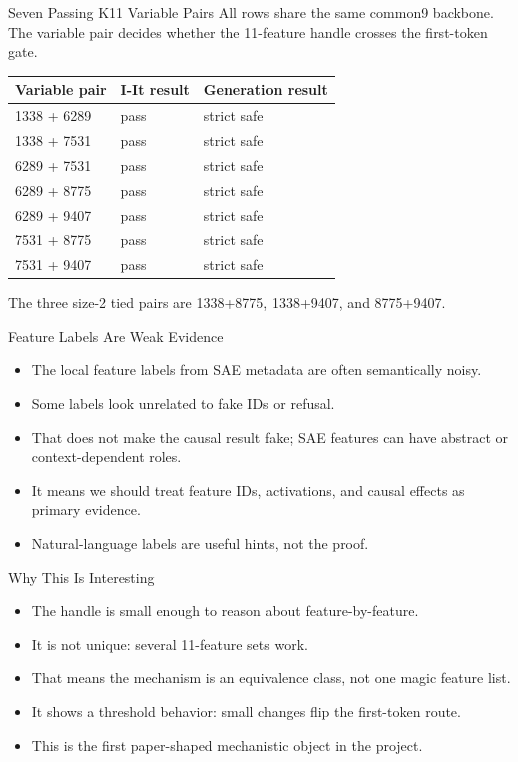 \documentclass[aspectratio=169]{beamer}
\begin{document}
\begin{frame}{Seven Passing K11 Variable Pairs}
\scriptsize
All rows share the same common9 backbone. The variable pair decides whether the
11-feature handle crosses the first-token gate.

\vspace{0.4em}
\begin{tabular}{lll}
\toprule
Variable pair & I-It result & Generation result \\
\midrule
1338 + 6289 & pass & strict safe \\
1338 + 7531 & pass & strict safe \\
6289 + 7531 & pass & strict safe \\
6289 + 8775 & pass & strict safe \\
6289 + 9407 & pass & strict safe \\
7531 + 8775 & pass & strict safe \\
7531 + 9407 & pass & strict safe \\
\bottomrule
\end{tabular}

\vspace{0.4em}
The three size-2 tied pairs are 1338+8775, 1338+9407, and 8775+9407.

\end{frame}

\begin{frame}{Feature Labels Are Weak Evidence}
\small
\begin{itemize}
  \item The local feature labels from SAE metadata are often semantically noisy.
  \item Some labels look unrelated to fake IDs or refusal.
  \item That does not make the causal result fake; SAE features can have abstract or context-dependent roles.
  \item It means we should treat feature IDs, activations, and causal effects as primary evidence.
  \item Natural-language labels are useful hints, not the proof.
\end{itemize}
\end{frame}

\begin{frame}{Why This Is Interesting}
\small
\begin{itemize}
  \item The handle is small enough to reason about feature-by-feature.
  \item It is not unique: several 11-feature sets work.
  \item That means the mechanism is an equivalence class, not one magic feature list.
  \item It shows a threshold behavior: small changes flip the first-token route.
  \item This is the first paper-shaped mechanistic object in the project.
\end{itemize}
\end{frame}
\end{document}
